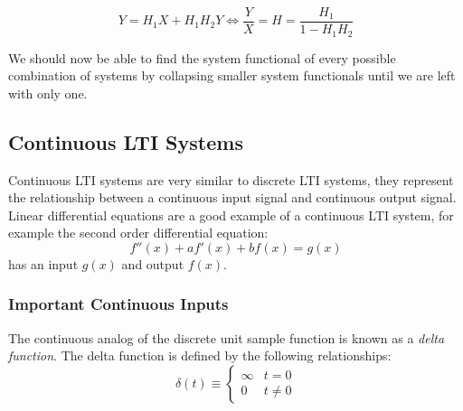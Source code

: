 \documentclass[a4paper]{article}
\numberwithin{equation}{section}
\begin{document}
\begin{center}
\end{center}

\begin{equation}
Y=H_1X+H_1H_2Y  \Longleftrightarrow \frac{Y}{X}=H=\frac{H_1}{1-H_1H_2}
\end{equation}

We should now be able to find the system functional of every possible combination of systems by collapsing smaller system functionals until we are left with only one. 

\subsection{Continuous LTI Systems}
Continuous LTI systems are very similar to discrete LTI systems, they represent the relationship between a continuous input signal and continuous output signal. Linear differential equations are a good example of a continuous LTI system, for example the second order differential equation:
\begin{equation}
f''(x)+af'(x)+bf(x) = g(x)
\end{equation}
has an input $g(x)$ and output $f(x)$.

\subsubsection{Important Continuous Inputs}
The continuous analog of the discrete unit sample function is known as a \textit{delta function}. The delta function is defined by the following relationships:
\begin{equation}
\delta(t) \equiv
\begin{cases} 
      \infty & t=0 \\
      0 & t \neq 0
   \end{cases}
\end{equation}
\end{document}
